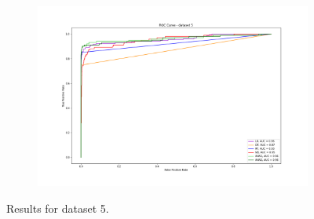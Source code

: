 \documentclass{Configuration_Files/PoliMi3i_thesis}
\begin{document}
\begin{figure}[H]
\begin{subfigure}
    \centering
    \includegraphics[scale=0.3]{Images/ROC_5.png}
\end{subfigure}
  \caption{Results for dataset 5.}
\end{figure}
\end{document}
